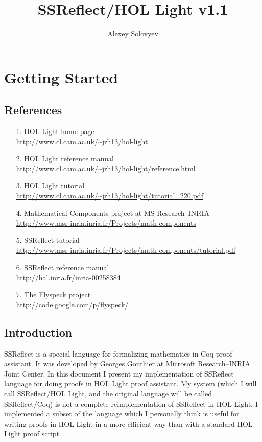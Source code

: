 \documentclass[a4paper]{article}
\title{SSReflect/HOL Light v1.1}
\author{Alexey Solovyev}
\begin{document}
\maketitle

\tableofcontents

\pagebreak
\section{Getting Started}

\subsection{References}
\begin{itemize}
\item[1.] HOL Light home page\\ 
	\url{http://www.cl.cam.ac.uk/~jrh13/hol-light}
\item[2.] HOL Light reference manual\\
	\url{http://www.cl.cam.ac.uk/~jrh13/hol-light/reference.html}
\item[3.] HOL Light tutorial\\
	\url{http://www.cl.cam.ac.uk/~jrh13/hol-light/tutorial_220.pdf}
\item[4.] Mathematical Components project at MS Research--INRIA\\
	\url{http://www.msr-inria.inria.fr/Projects/math-components}
\item[5.] SSReflect tutorial\\
	\url{http://www.msr-inria.inria.fr/Projects/math-components/tutorial.pdf}
\item[6.] SSReflect reference manual\\
	\url{http://hal.inria.fr/inria-00258384}
\item[7.] The Flyspeck project\\
	\url{http://code.google.com/p/flyspeck/}
\end{itemize}

\subsection{Introduction}
SSReflect is a special language for formalizing mathematics in Coq proof assistant. It was developed by Georges Gonthier at Microsoft Research--INRIA Joint Center. In this document I present my implementation of SSReflect language for doing proofs in HOL Light proof assistant. My system (which I will call SSReflect/HOL Light, and the original language will be called SSReflect/Coq) is not a complete reimplementation of SSReflect in HOL Light. I implemented a subset of the language which I personally think is useful for writing proofs in HOL Light in a more efficient way than with a standard HOL Light proof script.
\end{document}
